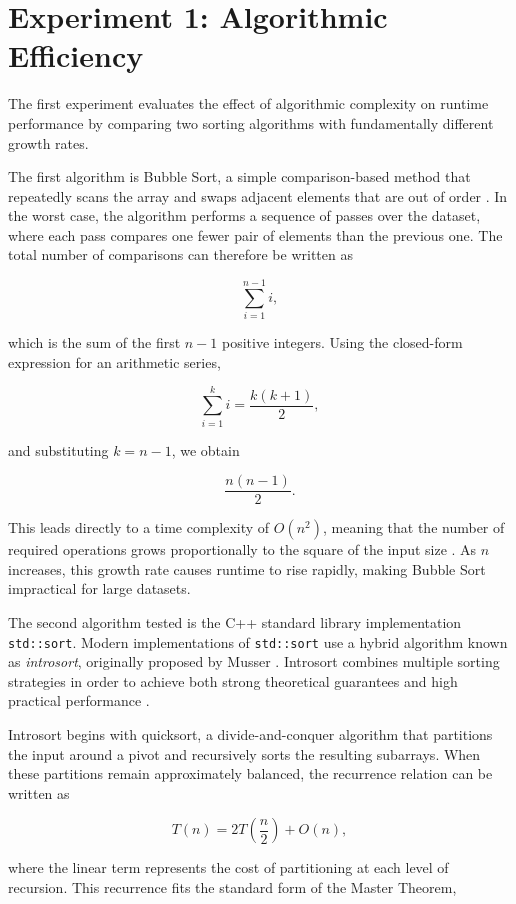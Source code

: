\section{Experiment 1: Algorithmic Efficiency}

The first experiment evaluates the effect of algorithmic complexity on runtime performance by comparing two sorting algorithms with fundamentally different growth rates.

The first algorithm is Bubble Sort, a simple comparison-based method that repeatedly scans the array and swaps adjacent elements that are out of order \cite{knuth1998}. In the worst case, the algorithm performs a sequence of passes over the dataset, where each pass compares one fewer pair of elements than the previous one. The total number of comparisons can therefore be written as

\[
\sum_{i=1}^{n-1} i,
\]

which is the sum of the first \(n-1\) positive integers. Using the closed-form expression for an arithmetic series,

\[
\sum_{i=1}^{k} i = \frac{k(k+1)}{2},
\]

and substituting \(k = n-1\), we obtain

\[
\frac{n(n-1)}{2}.
\]

This leads directly to a time complexity of \(O(n^2)\), meaning that the number of required operations grows proportionally to the square of the input size \cite{knuth1998}. As \(n\) increases, this growth rate causes runtime to rise rapidly, making Bubble Sort impractical for large datasets.

The second algorithm tested is the C++ standard library implementation \texttt{std::sort}. Modern implementations of \texttt{std::sort} use a hybrid algorithm known as \textit{introsort}, originally proposed by Musser \cite{musser1997}. Introsort combines multiple sorting strategies in order to achieve both strong theoretical guarantees and high practical performance \cite{musser1997, cppreference_sort}.

Introsort begins with quicksort, a divide-and-conquer algorithm that partitions the input around a pivot and recursively sorts the resulting subarrays. When these partitions remain approximately balanced, the recurrence relation can be written as

\[
T(n) = 2T\!\left(\frac{n}{2}\right) + O(n),
\]

where the linear term represents the cost of partitioning at each level of recursion. This recurrence fits the standard form of the Master Theorem,


